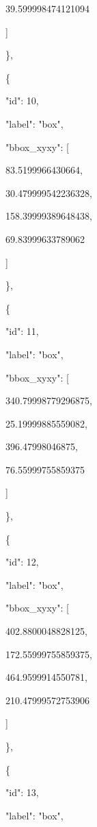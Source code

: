 \documentclass[10pt,a4paper]{article}
\begin{document}
        39.599998474121094\par
      ]\par
    \},\allowbreak{}\par
    \{\par
      "id":\allowbreak{} 10,\allowbreak{}\par
      "label":\allowbreak{} "box",\allowbreak{}\par
      "bbox\_xyxy":\allowbreak{} [\par
        83.5199966430664,\allowbreak{}\par
        30.479999542236328,\allowbreak{}\par
        158.39999389648438,\allowbreak{}\par
        69.83999633789062\par
      ]\par
    \},\allowbreak{}\par
    \{\par
      "id":\allowbreak{} 11,\allowbreak{}\par
      "label":\allowbreak{} "box",\allowbreak{}\par
      "bbox\_xyxy":\allowbreak{} [\par
        340.79998779296875,\allowbreak{}\par
        25.19999885559082,\allowbreak{}\par
        396.47998046875,\allowbreak{}\par
        76.55999755859375\par
      ]\par
    \},\allowbreak{}\par
    \{\par
      "id":\allowbreak{} 12,\allowbreak{}\par
      "label":\allowbreak{} "box",\allowbreak{}\par
      "bbox\_xyxy":\allowbreak{} [\par
        402.8800048828125,\allowbreak{}\par
        172.55999755859375,\allowbreak{}\par
        464.9599914550781,\allowbreak{}\par
        210.47999572753906\par
      ]\par
    \},\allowbreak{}\par
    \{\par
      "id":\allowbreak{} 13,\allowbreak{}\par
      "label":\allowbreak{} "box",\allowbreak{}\par
\end{document}
